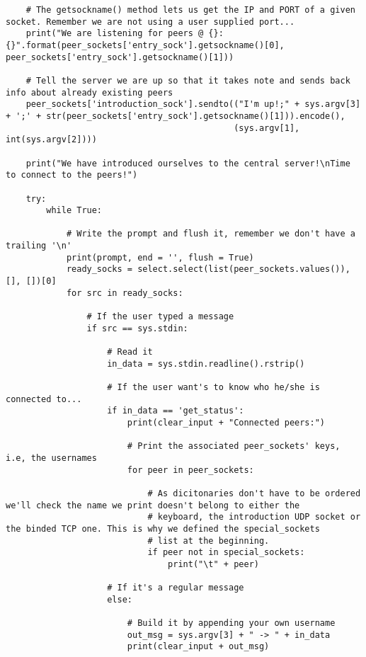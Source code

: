 \documentclass[landscape]{article}
\begin{document}
\begin{verbatim}
    # The getsockname() method lets us get the IP and PORT of a given socket. Remember we are not using a user supplied port...
    print("We are listening for peers @ {}:{}".format(peer_sockets['entry_sock'].getsockname()[0], peer_sockets['entry_sock'].getsockname()[1]))

    # Tell the server we are up so that it takes note and sends back info about already existing peers
    peer_sockets['introduction_sock'].sendto(("I'm up!;" + sys.argv[3] + ';' + str(peer_sockets['entry_sock'].getsockname()[1])).encode(),
                                             (sys.argv[1], int(sys.argv[2])))

    print("We have introduced ourselves to the central server!\nTime to connect to the peers!")

    try:
        while True:

            # Write the prompt and flush it, remember we don't have a trailing '\n'
            print(prompt, end = '', flush = True)
            ready_socks = select.select(list(peer_sockets.values()), [], [])[0]
            for src in ready_socks:

                # If the user typed a message
                if src == sys.stdin:

                    # Read it
                    in_data = sys.stdin.readline().rstrip()

                    # If the user want's to know who he/she is connected to...
                    if in_data == 'get_status':
                        print(clear_input + "Connected peers:")

                        # Print the associated peer_sockets' keys, i.e, the usernames
                        for peer in peer_sockets:

                            # As dicitonaries don't have to be ordered we'll check the name we print doesn't belong to either the
                            # keyboard, the introduction UDP socket or the binded TCP one. This is why we defined the special_sockets
                            # list at the beginning.
                            if peer not in special_sockets:
                                print("\t" + peer)

                    # If it's a regular message
                    else:

                        # Build it by appending your own username
                        out_msg = sys.argv[3] + " -> " + in_data
                        print(clear_input + out_msg)


\end{verbatim}
\end{document}
